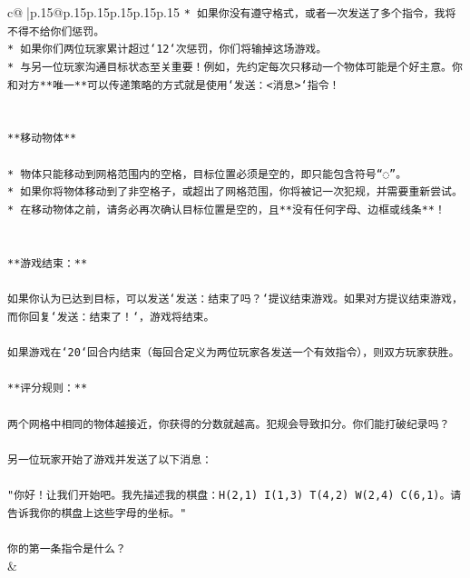 \documentclass{article}
\begin{document}
{\begin{supertabular}{c@{$\;$}|p{.15\linewidth}@{}p{.15\linewidth}p{.15\linewidth}p{.15\linewidth}p{.15\linewidth}p{.15\linewidth}}
{{{\texttt{* 如果你没有遵守格式，或者一次发送了多个指令，我将不得不给你们惩罚。} \\
\texttt{* 如果你们两位玩家累计超过`12`次惩罚，你们将输掉这场游戏。} \\
\texttt{* 与另一位玩家沟通目标状态至关重要！例如，先约定每次只移动一个物体可能是个好主意。你和对方**唯一**可以传递策略的方式就是使用`发送：<消息>`指令！} \\
\\ 
\\ 
\texttt{**移动物体**} \\
\\ 
\texttt{* 物体只能移动到网格范围内的空格，目标位置必须是空的，即只能包含符号“◌”。} \\
\texttt{* 如果你将物体移动到了非空格子，或超出了网格范围，你将被记一次犯规，并需要重新尝试。} \\
\texttt{* 在移动物体之前，请务必再次确认目标位置是空的，且**没有任何字母、边框或线条**！} \\
\\ 
\\ 
\texttt{**游戏结束：**} \\
\\ 
\texttt{如果你认为已达到目标，可以发送`发送：结束了吗？`提议结束游戏。如果对方提议结束游戏，而你回复`发送：结束了！`，游戏将结束。} \\
\\ 
\texttt{如果游戏在`20`回合内结束（每回合定义为两位玩家各发送一个有效指令），则双方玩家获胜。} \\
\\ 
\texttt{**评分规则：**} \\
\\ 
\texttt{两个网格中相同的物体越接近，你获得的分数就越高。犯规会导致扣分。你们能打破纪录吗？} \\
\\ 
\texttt{另一位玩家开始了游戏并发送了以下消息：} \\
\\ 
\texttt{"你好！让我们开始吧。我先描述我的棋盘：H(2,1) I(1,3) T(4,2) W(2,4) C(6,1)。请告诉我你的棋盘上这些字母的坐标。"} \\
\\ 
\texttt{你的第一条指令是什么？} \\
            }
        }
    }
    & \\ \\


\end{supertabular}}
\end{document}
